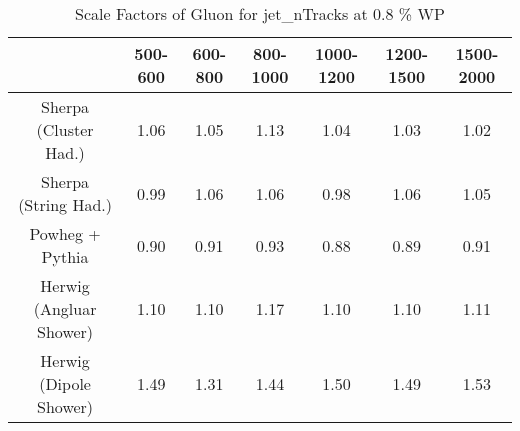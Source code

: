\begin{table}
\centering
\caption{Scale Factors of Gluon for jet_nTracks at 0.8 \% WP}
\label{tab:SF_MC_jet_nTracks_0.8_Gluon}
\begin{tabular}{ccccccc}
\toprule
{} &  500-600 &  600-800 &  800-1000 &  1000-1200 &  1200-1500 &  1500-2000 \\
\midrule
Sherpa (Cluster Had.)   &     1.06 &     1.05 &      1.13 &       1.04 &       1.03 &       1.02 \\
Sherpa (String Had.)    &     0.99 &     1.06 &      1.06 &       0.98 &       1.06 &       1.05 \\
Powheg + Pythia         &     0.90 &     0.91 &      0.93 &       0.88 &       0.89 &       0.91 \\
Herwig (Angluar Shower) &     1.10 &     1.10 &      1.17 &       1.10 &       1.10 &       1.11 \\
Herwig (Dipole Shower)  &     1.49 &     1.31 &      1.44 &       1.50 &       1.49 &       1.53 \\
\bottomrule
\end{tabular}
\end{table}
